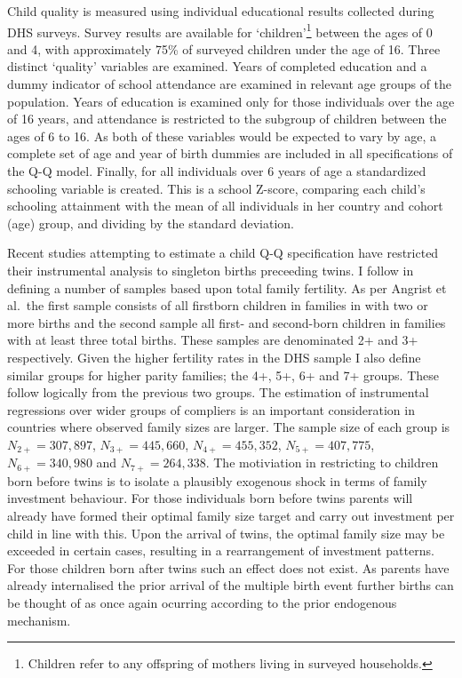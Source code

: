\documentclass{article}[11pt,subeqn]
\begin{document}
\begin{spacing}{1.5}
\begin{table}[ht]
\begin{center}
\begin{tabular}{lccp{5mm}ccp{5mm}cc}
\end{tabular}
\end{center}
\end{table}

Child quality is measured using individual educational results collected during DHS surveys.   Survey results are available for `children'\footnote{Children refer to any offspring of 
mothers living in surveyed households.} 
between the ages of 0 and 4, with approximately 75\% of surveyed children 
under the age of 16. Three distinct `quality' variables are examined.  Years of completed education and a dummy indicator of school attendance
are examined in relevant age groups of the population.  Years of education is examined only for those individuals over the age of 16 years, and
attendance is restricted to the subgroup of children between the ages of 6 to 16.     As both of these 
variables would be expected to vary by age, a complete set of age and year of birth dummies are included in all specifications of the Q-Q model.  
Finally, for all individuals over 6 years of age a standardized schooling variable is created.  This is a school Z-score, comparing each child's
schooling attainment with the mean of all individuals in her country and cohort (age) group, and dividing by the standard deviation.  

Recent studies attempting to estimate a child Q-Q specification have restricted their instrumental analysis to singleton births preceeding 
twins.  I follow \citet{Angristetal2010} in defining a number of samples based upon total family fertility.  As per Angrist et al.\ the first sample 
consists of all firstborn children in families in with two or more births and the second sample all first- and second-born children in families 
with at least three total births.  These samples are denominated 2+ and 3+ respectively.  Given the higher fertility rates in the DHS sample I also 
define similar groups for higher parity families; the 4+, 5+, 6+ and 7+ groups.  These follow logically from the previous two groups.  The estimation 
of instrumental regressions over wider groups of compliers is an important consideration in countries where observed family sizes are larger.  The 
sample size of each group is $N_{2+}= 307,897$, $N_{3+}=445,660$, $N_{4+}= 455,352$, $N_{5+}=407,775$, $N_{6+}=340,980$ and $N_{7+}=264,338$.  
The motiviation 
in restricting to children born before twins is to isolate a plausibly exogenous shock in terms of family investment behaviour.  For those 
individuals born before twins parents will already have formed their optimal family size target and carry out investment per child in line 
with this.  Upon the arrival of twins, the optimal family size may be exceeded in certain cases, resulting in a rearrangement of investment 
patterns.  For those children born after twins such an effect does not exist.  As parents have already internalised the prior arrival of the 
multiple birth event further births can be thought of as once again ocurring according to the prior endogenous mechanism.


\end{spacing}
\end{document}
